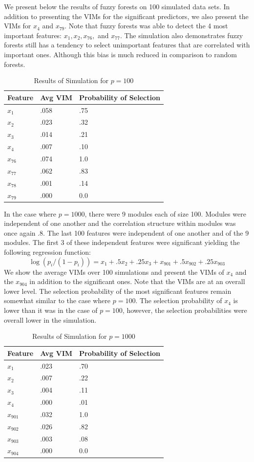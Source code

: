 \documentclass[article,shortnames]{jss}
\begin{document}
We present below the results of fuzzy forests on 100 simulated data sets.  In addition to presenting the VIMs
for the significant predictors, we also present the VIMs for $x_{4}$ and $x_{79}$.  Note that fuzzy forests was
able to detect the 4 most important features: $x_{1}, x_{2}, x_{76},$ and $x_{77}$.  The simulation also 
demonstrates fuzzy forests still has a tendency to select unimportant features that are correlated with important 
ones.   Although this bias is much reduced in comparison to random forests.
\begin{table}[hc]
\centering
\caption{Results of Simulation for $p=100$}
\begin{tabular}{lll}
Feature&Avg VIM& Probability of Selection\\
\hline
$x_{1}$  & .058 &  .75\\
$x_{2}$  & .023 &  .32\\
$x_{3}$  & .014 &  .21\\
$x_{4}$ & .007 &  .10\\
$x_{76}$ & .074 & 1.0\\
$x_{77}$ & .062 & .83 \\
$x_{78}$ & .001 & .14 \\
$x_{79}$ & .000 & 0.0
\end{tabular}
\end{table}

In the case where $p=1000$, there were 9 modules each of size 100.  Modules were independent of one
another and the correlation structure within modules was  once again .8.  The last 100 features were independent
of one another and of the 9 modules.  The first 3 of these independent features were significant yielding the following
regression function:
\begin{equation}
\log(p_{i}/(1-p_{i})) = x_{1} + .5x_{2} + .25x_{3} + x_{901} + .5x_{902} + .25x_{903}
\end{equation}
We show the average VIMs over 100 simulations and present the VIMs of $x_{4}$ and the $x_{904}$ in
addition to the significant ones. Note that the VIMs are at an overall lower level.  The selection probability 
of the most significant features remain somewhat similar to the case where $p=100$.  The selection 
probability of $x_{4}$ is lower than it was in the case of $p=100$, however, the selection probabilities
were overall lower in the simulation.
\begin{table}[hc]
\centering
\caption{Results of Simulation for $p=1000$}
\begin{tabular}{lll}
Feature&Avg VIM& Probability of Selection\\
\hline
$x_{1}$  & .023 & .70\\
$x_{2}$  & .007 & .22\\
$x_{3}$ & .004 &  .11\\
$x_{4}$  & .000 &  .01\\
$x_{901}$ & .032 & 1.0\\
$x_{902}$ & .026 & .82\\
$x_{903}$ & .003 & .08\\
$x_{904}$ & .000 & 0.0
\end{tabular}
\end{table}


\clearpage    


\end{document}
